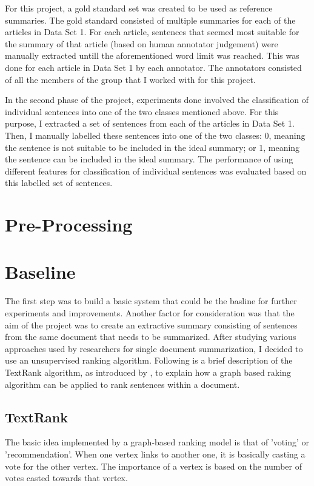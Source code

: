 For this project, a gold standard set was created to be used as reference summaries.
The gold standard consisted of multiple summaries for each of the articles in Data Set 1.
For each article, sentences that seemed most suitable for the summary of that article (based on human annotator judgement) were manually extracted untill the aforementioned word limit was reached.
This was done for each article in Data Set 1 by each annotator.
The annotators consisted of all the members of the group that I worked with for this project.

In the second phase of the project, experiments done involved the classification of individual sentences into one of the two classes mentioned above.
For this purpose, I extracted a set of sentences from each of the articles in Data Set 1.
Then, I manually labelled these sentences into one of the two classes: 0, meaning the sentence is not suitable to be included in the ideal summary; or 1, meaning the sentence can be included in the ideal summary.
The performance of using different features for classification of individual sentences was evaluated based on this labelled set of sentences.

\section{Pre-Processing}

\section{Baseline}
The first step was to build a basic system that could be the basline for further experiments and improvements.
Another factor for consideration was that the aim of the project was to create an extractive summary consisting of sentences from the same document that needs to be summarized.
After studying various approaches used by researchers for single document summarization, I decided to use an unsupervised ranking algorithm.
Following is a brief description of the TextRank algorithm, as introduced by \citep{Mihalcea et. al.[]}, to explain how a graph based raking algorithm can be applied to rank sentences within a document.

\subsection{TextRank}
The basic idea implemented by a graph-based ranking model is that of 'voting' or 'recommendation'.
When one vertex links to another one, it is basically casting a vote for the other vertex.
The importance of a vertex is based on the number of votes casted towards that vertex. 

